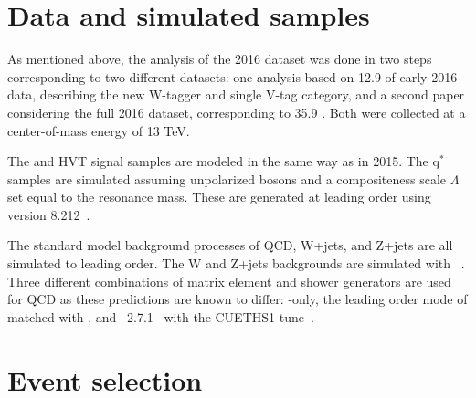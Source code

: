 \section{Data and simulated samples}
\label{sec:searchII:samples}
As mentioned above, the analysis of the 2016 dataset was done in two steps corresponding to two different datasets: one analysis based on 12.9 \fbinv of early 2016 data, describing the new W-tagger and single V-tag category, and a second paper considering the full 2016 dataset, corresponding to 35.9 \fbinv. Both were collected at a center-of-mass energy of 13 TeV.\par
The \BulkG and HVT signal samples are modeled in the same way as in 2015. The $\textrm{q}^*$ samples are simulated assuming unpolarized bosons and a compositeness scale $\Lambda$ set equal to the resonance mass. These are generated at leading order using \PYTHIA version 8.212~\cite{Sjostrand:2007gs}. \par
The standard model background processes of QCD, W+jets, and Z+jets are all simulated to leading order. The W and Z+jets backgrounds are simulated with \amcatnlo~\cite{Alwall:2014hca,Alwall:2007fs}. Three different combinations of matrix element and shower generators are used for QCD as these predictions are known to differ: \PYTHIA-only, the leading order mode of \amcatnlo{} matched with \PYTHIA, and \HERWIG{++}~2.7.1~\cite{Bahr:2008pv} with the CUETHS1 tune~\cite{Khachatryan:2015pea}.

\section{Event selection}
